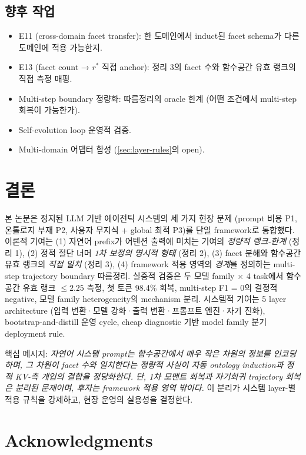 \documentclass[11pt]{article}
\theoremstyle{definition}
\begin{document}
\subsection{향후 작업}
\begin{itemize}[leftmargin=*]
\item E11 (cross-domain facet transfer): 한 도메인에서 induct된 facet schema가 다른 도메인에 적용 가능한지.
\item E13 (facet count → $r^*$ 직접 anchor): 정리 3의 facet 수와 함수공간 유효 랭크의 직접 측정 매핑.
\item Multi-step boundary 정량화: 따름정리의 oracle 한계 (어떤 조건에서 multi-step 회복이 가능한가).
\item Self-evolution loop 운영적 검증.
\item Multi-domain 어댑터 합성 (\cref{sec:layer-rules}의 open).
\end{itemize}

\section{결론}
\label{sec:conclusion}

본 논문은 정지된 LLM 기반 에이전틱 시스템의 세 가지 현장 문제 (prompt 비용 P1, 온톨로지 부재 P2, 사용자 무지식 + global 최적 P3)를 단일 framework로 통합했다. 이론적 기여는 (1) 자연어 prefix가 어텐션 출력에 미치는 기여의 \emph{정량적 랭크-한계} (정리 1), (2) 정적 절단 너머 \emph{1차 보정의 명시적 형태} (정리 2), (3) facet 분해와 함수공간 유효 랭크의 \emph{직접 일치} (정리 3), (4) framework 적용 영역의 \emph{경계}를 정의하는 multi-step trajectory boundary 따름정리. 실증적 검증은 두 모델 family $\times$ 4 task에서 함수공간 유효 랭크 $\le 2.25$ 측정, 첫 토큰 98.4\% 회복, multi-step F1 = 0의 결정적 negative, 모델 family heterogeneity의 mechanism 분리. 시스템적 기여는 5 layer architecture (입력 변환·모델 강화·출력 변환·프롬프트 엔진·자기 진화), bootstrap-and-distill 운영 cycle, cheap diagnostic 기반 model family 분기 deployment rule.

핵심 메시지: \emph{자연어 시스템 prompt는 함수공간에서 매우 작은 차원의 정보를 인코딩하며, 그 차원이 facet 수와 일치한다는 정량적 사실이 자동 ontology induction과 정적 KV-측 개입의 결합을 정당화한다. 단, 1차 모멘트 회복과 자기회귀 trajectory 회복은 분리된 문제이며, 후자는 framework 적용 영역 밖이다.} 이 분리가 시스템 layer-별 적용 규칙을 강제하고, 현장 운영의 실용성을 결정한다.

\section*{Acknowledgments}
\end{document}
